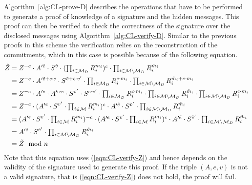 Algorithm~\ref{alg:CL-prove-D} describes the operations that have to be
performed to generate a proof of knowledge of a signature and the hidden
messages. This proof can then be verified to check the correctness of the
signature over the disclosed messages using Algorithm~\ref{alg:CL-verify-D}.
Similar to the previous proofs in this scheme the verification relies on the
reconstruction of the commitments, which in this case is possible because of the
following equation.
\begin{align*}
  \hat{Z}
  & = Z^{-c} \cdot A'^{\hat{e}} \cdot S^{\hat{v}}
    \cdot (\textstyle\prod_{i \in \mathcal{M}_D} R_i^{m_i})^c
    \cdot \textstyle\prod_{i \in \mathcal{M} \setminus \mathcal{M}_D} R_i^{\hat{m}_i} \\
  & = Z^{-c} \cdot A'^{\tilde{e} + c \cdot e} \cdot S^{\tilde{v} + c \cdot v'}
    \cdot \textstyle\prod_{i \in \mathcal{M}_D} R_i^{c \cdot m_i}
    \cdot \textstyle\prod_{i \in \mathcal{M} \setminus \mathcal{M}_D} R_i^{\tilde{m}_i + c \cdot m_i} \\
  & = Z^{-c} \cdot A'^{\tilde{e}} \cdot A'^{c \cdot e}
    \cdot S^{\tilde{v}'} \cdot S^{c \cdot v'}
    \cdot \textstyle\prod_{i \in \mathcal{M}_D} R_i^{c \cdot m_i}
    \cdot \textstyle\prod_{i \in \mathcal{M} \setminus \mathcal{M}_D} R_i^{\tilde{m}_i}
    \cdot \textstyle\prod_{i \in \mathcal{M} \setminus \mathcal{M}_D} R_i^{c \cdot m_i} \\
  & = Z^{-c}
    \cdot (A'^{e} \cdot S^{v'} \cdot \textstyle\prod_{i \in \mathcal{M}} R_i^{m_i})^c
    \cdot A'^{\tilde{e}} \cdot S^{\tilde{v}'}
    \cdot \textstyle\prod_{i \in \mathcal{M} \setminus \mathcal{M}_D} R_i^{\tilde{m}_i} \\
  & = (A'^{e} \cdot S^{v'} \cdot \textstyle\prod_{i \in \mathcal{M}} R_i^{m_i})^{-c}
    \cdot (A'^{e} \cdot S^{v'} \cdot \textstyle\prod_{i \in \mathcal{M}} R_i^{m_i})^c
    \cdot A'^{\tilde{e}} \cdot S^{\tilde{v}'}
    \cdot \textstyle\prod_{i \in \mathcal{M} \setminus \mathcal{M}_D} R_i^{\tilde{m}_i} \\
  & = A'^{\tilde{e}} \cdot S^{\tilde{v}'}
    \cdot \textstyle\prod_{i \in \mathcal{M} \setminus \mathcal{M}_D} R_i^{\tilde{m}_i} \\
  & = \tilde{Z} \mod n
\end{align*}
Note that this equation uses (\ref{eqn:CL-verify-Z}) and hence depends on the
validity of the signature used to generate this proof. If the triple $(A, e, v)$
is not a valid signature, that is (\ref{eqn:CL-verify-Z}) does not hold, the
proof will fail.

